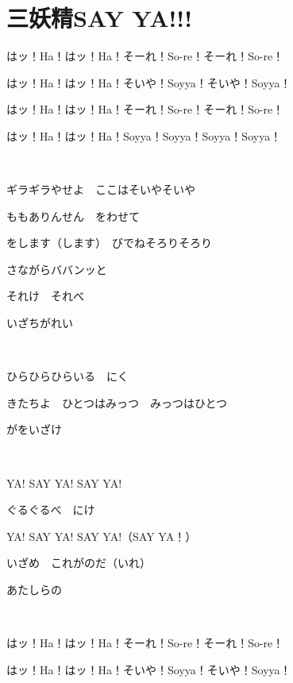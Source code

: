 \section{三妖精SAY YA!!!}

はッ！Ha！はッ！Ha！そーれ！So-re！そーれ！So-re！

はッ！Ha！はッ！Ha！そいや！Soyya！そいや！Soyya！

はッ！Ha！はッ！Ha！そーれ！So-re！そーれ！So-re！

はッ！Ha！はッ！Ha！Soyya！Soyya！Soyya！Soyya！

~

ギラギラやせよ　ここはそいやそいや

ももありんせん　をわせて

をします（します）　びでねそろりそろり

さながらババンッと

それけ　それべ

いざちがれい

~

ひらひらひらいる　にく

きたちよ　ひとつはみっつ　みっつはひとつ

がをいざけ

~

YA! SAY YA! SAY YA!

ぐるぐるべ　にけ

YA! SAY YA! SAY YA!（SAY YA！）

いざめ　これがのだ（いれ）

あたしらの

~

はッ！Ha！はッ！Ha！そーれ！So-re！そーれ！So-re！

はッ！Ha！はッ！Ha！そいや！Soyya！そいや！Soyya！

~

